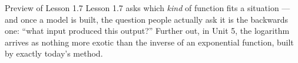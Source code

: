 \documentclass[10pt]{article}
\begin{document}
\vspace{0.1in}

\boxguard[9]
\begin{notesbox}{Preview of Lesson 1.7}
Lesson 1.7 asks which \textit{kind} of function fits a situation --- and once a
model is built, the question people actually ask it is the backwards one:
``what input produced this output?'' Further out, in Unit 5, the logarithm
arrives as nothing more exotic than the inverse of an exponential function,
built by exactly today's method.
\end{notesbox}
\end{document}
